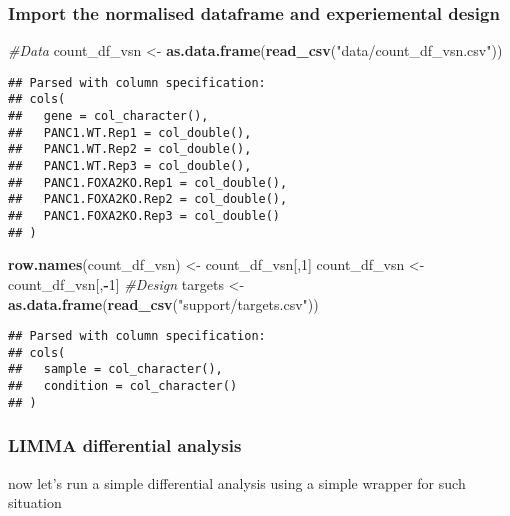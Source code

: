 \documentclass[]{article}
\newenvironment{Shaded}{\begin{snugshade}}{\end{snugshade}}
\newcommand{\CommentTok}[1]{\textcolor[rgb]{0.56,0.35,0.01}{\textit{#1}}}
\newcommand{\DecValTok}[1]{\textcolor[rgb]{0.00,0.00,0.81}{#1}}
\newcommand{\KeywordTok}[1]{\textcolor[rgb]{0.13,0.29,0.53}{\textbf{#1}}}
\newcommand{\NormalTok}[1]{#1}
\newcommand{\OperatorTok}[1]{\textcolor[rgb]{0.81,0.36,0.00}{\textbf{#1}}}
\newcommand{\StringTok}[1]{\textcolor[rgb]{0.31,0.60,0.02}{#1}}
\begin{document}
\hypertarget{import-the-normalised-dataframe-and-experiemental-design}{%
\subsubsection{Import the normalised dataframe and experiemental
design}\label{import-the-normalised-dataframe-and-experiemental-design}}

\begin{Shaded}
\begin{Highlighting}[]
\CommentTok{#Data}
\NormalTok{count_df_vsn <-}\StringTok{ }\KeywordTok{as.data.frame}\NormalTok{(}\KeywordTok{read_csv}\NormalTok{(}\StringTok{"data/count_df_vsn.csv"}\NormalTok{))}
\end{Highlighting}
\end{Shaded}

\begin{verbatim}
## Parsed with column specification:
## cols(
##   gene = col_character(),
##   PANC1.WT.Rep1 = col_double(),
##   PANC1.WT.Rep2 = col_double(),
##   PANC1.WT.Rep3 = col_double(),
##   PANC1.FOXA2KO.Rep1 = col_double(),
##   PANC1.FOXA2KO.Rep2 = col_double(),
##   PANC1.FOXA2KO.Rep3 = col_double()
## )
\end{verbatim}

\begin{Shaded}
\begin{Highlighting}[]
\KeywordTok{row.names}\NormalTok{(count_df_vsn) <-}\StringTok{ }\NormalTok{count_df_vsn[,}\DecValTok{1}\NormalTok{]}
\NormalTok{count_df_vsn <-}\StringTok{ }\NormalTok{count_df_vsn[,}\OperatorTok{-}\DecValTok{1}\NormalTok{]}
\CommentTok{#Design}
\NormalTok{targets <-}\StringTok{ }\KeywordTok{as.data.frame}\NormalTok{(}\KeywordTok{read_csv}\NormalTok{(}\StringTok{"support/targets.csv"}\NormalTok{))}
\end{Highlighting}
\end{Shaded}

\begin{verbatim}
## Parsed with column specification:
## cols(
##   sample = col_character(),
##   condition = col_character()
## )
\end{verbatim}

\hypertarget{limma-differential-analysis}{%
\subsubsection{LIMMA differential
analysis}\label{limma-differential-analysis}}

now let's run a simple differential analysis using a simple wrapper for
such situation
\end{document}
